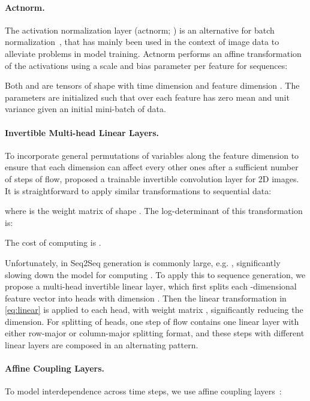 \documentclass[11pt,a4paper]{article}
\begin{document}
\paragraph{Actnorm.} The activation normalization layer (actnorm; \citet{kingma2018glow}) is an alternative for batch normalization~\citep{ioffe2015batch}, that has mainly been used in the context of image data to alleviate problems in model training. 
Actnorm performs an affine transformation of the activations using a scale and bias parameter per feature for sequences:

{\small

}
Both  and  are tensors of shape  with time dimension  and feature dimension .
The parameters are initialized such that over each feature  has zero mean and unit variance given an initial mini-batch of data. 

\paragraph{Invertible Multi-head Linear Layers.}
To incorporate general permutations of variables along the feature dimension to ensure that each dimension can affect every other ones after a sufficient number of steps of flow, \citet{kingma2018glow} proposed a trainable invertible  convolution layer for 2D images.
It is straightforward to apply similar transformations to sequential data:

\vspace{-1mm}
{\small

}
where  is the weight matrix of shape .
The log-determinant of this transformation is:

\vspace{-2mm}
{\small

}
The cost of computing  is .

Unfortunately,  in Seq2Seq generation is commonly large, e.g. , significantly slowing down the model for computing . 
To apply this to sequence generation, we propose a multi-head invertible linear layer, which first splits each -dimensional feature vector into  heads with dimension .
Then the linear transformation in \eqref{eq:linear} is applied to each head, with  weight matrix , significantly reducing the dimension.
For splitting of heads, one step of flow contains one linear layer with either row-major or column-major splitting format, and these steps with different linear layers are composed in an alternating pattern.


\paragraph{Affine Coupling Layers.} 
To model interdependence across time steps, we use affine coupling layers~\citep{dinh2016density}:
\end{document}
